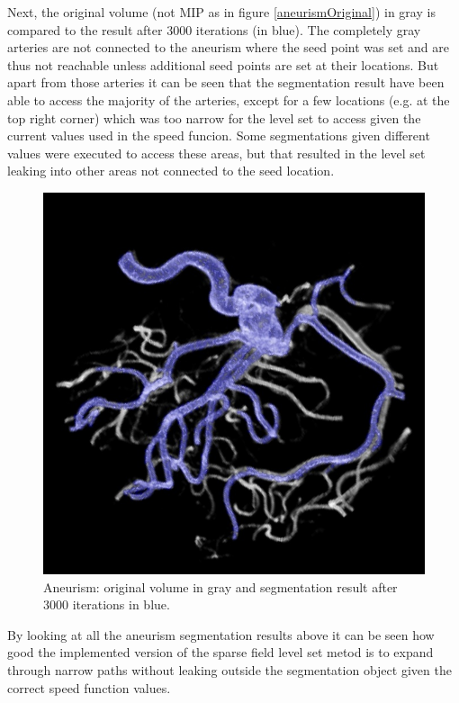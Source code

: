 Next, the original volume (not MIP as in figure \ref{aneurismOriginal}) in gray is compared to the result after 3000 iterations (in blue). The completely gray arteries are not connected to the aneurism where the seed point was set and are thus not reachable unless additional seed points are set at their locations. But apart from those arteries it can be seen that the segmentation result have been able to access the majority of the arteries, except for a few locations (e.g. at the top right corner) which was too narrow for the level set to access given the current values used in the speed funcion. Some segmentations given different values were executed to access these areas, but that resulted in the level set leaking into other areas not connected to the seed location.
\begin{figure}[h!]
\centering
\includegraphics[width=.9\textwidth]{results/3D/aneurism_orginal_3000_iter}
\caption{Aneurism: original volume in gray and segmentation result after 3000 iterations in blue.}
\label{aneurismorginal3000iter}
\end{figure}

By looking at all the aneurism segmentation results above it can be seen how good the implemented version of the sparse field level set metod is to expand through narrow paths without leaking outside the segmentation object given the correct speed function values.

